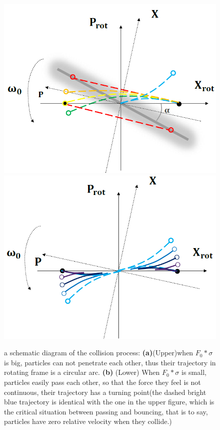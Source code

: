 \documentclass[aps,pre,twocolumn,groupedaddress]{revtex4-1}
\begin{document}
\begin{figure}
\centering
\includegraphics[scale=0.3]{ZhiyuPictures/bounce.png}
\includegraphics[scale=0.32]{ZhiyuPictures/pass.png}
\caption{a schematic diagram of the collision process: \textbf{(a)}(Upper)when $F_0*\sigma$ is big, particles can not penetrate each other, thus their trajectory in rotating frame is a circular arc.  \textbf{(b)} (Lower) When $F_0*\sigma$ is small, particles easily pass each other, so that the force they feel is not continuous, their trajectory has a turning point(the dashed bright blue trajectory is identical with the one in the upper figure, which is the critical situation between passing and bouncing, that is to say, particles have zero relative velocity when they collide.) }
\label{fig:Breathingfrequency3}
\end{figure}
\end{document}
